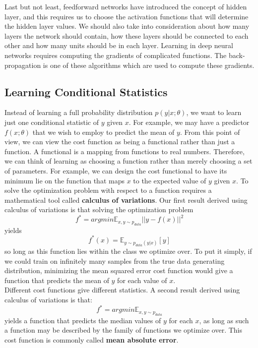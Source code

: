 Last but not least, feedforward networks have introduced the concept of hidden layer, and this requires us to choose the activation functions that will determine the hidden layer values. We should also take into consideration about how many layers the network should contain, how these layers should be connected to each other and how many units should be in each layer. Learning in deep neural networks requires computing the gradients of complicated functions. The back-propagation is one of these algorithms which are used to compute these gradients. 
\subsection{Learning Conditional Statistics}
Instead of learning a full probability distribution $p(y |x;\theta)$, we want to learn just one conditional statistic of $y$ given $x$. For example, we may have a predictor $f(x;\theta)$ that we wish to employ to predict the mean of $y$. From this point of view, we can view the cost function as being a functional rather than just a function. A functional is a mapping from functions to real numbers. Therefore, we can think of learning as choosing a function rather than merely choosing a set of parameters. For example, we can design the cost functional to have its minimum lie on the function that maps $x$ to the expected value of $y$ given $x$. To solve the optimization problem with respect to a function requires a mathematical tool called \textbf{calculus of variations}. \cite{gelfand_calculus_2000}
Our first result derived using calculus of variations is that solving the optimization problem
\begin{equation}
f^{*} = argmin \mathbb{E}_{x,y \sim p_{data}}||y - f(x)||^2
\end{equation}
yields
\begin{equation}
f^*(x) = \mathbb{E}_{y \sim p_{data}(y|x)}[y] 
\end{equation}
so long as this function lies within the class we optimize over. To put it simply, if we could train on infinitely many samples from the true data generating distribution, minimizing the mean squared error cost function would give a function that predicts the mean of $y$ for each value of $x$.\\
Different cost functions give different statistics. A second result derived using calculus of variations is that:
\begin{equation}
f^* = arg min \mathbb{E}_{x,y \sim p_{data}}
\end{equation}
yields a function that predicts the median values of $y$ for each $x$, as long as such a function may be described by the family of functions we optimize over. This cost function is commonly called \textbf{mean absolute error}.\cite{Goodfellow-et-al-2016}\\
